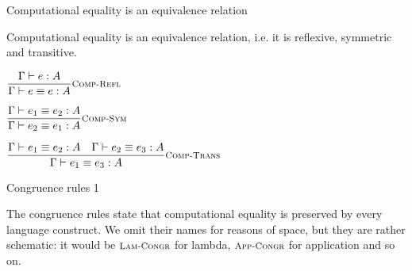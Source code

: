 \documentclass{beamer}
\begin{document}
\begin{frame}{Computational equality is an equivalence relation}

Computational equality is an equivalence relation, i.e. it is reflexive, symmetric and transitive.

\vspace{2em}

\begin{center}
  $\infrule[Comp-Refl]{\typing{e}{A}}{\compeq{e}{e}{A}}$

  \vspace{2em}

  $\infrule[Comp-Sym]{\compeq{e_1}{e_2}{A}}{\compeq{e_2}{e_1}{A}}$

  \vspace{2em}

  $\infrule[Comp-Trans]{\compeq{e_1}{e_2}{A} \quad \compeq{e_2}{e_3}{A}}{\compeq{e_1}{e_3}{A}}$
\end{center}

\end{frame}

\begin{frame}{Congruence rules 1}

The congruence rules state that computational equality is preserved by every language construct. We omit their names for reasons of space, but they are rather schematic: it would be $\textsc{\footnotesize{Lam-Congr}}$ for lambda, $\textsc{\footnotesize{App-Congr}}$ for application and so on.

\end{frame}
\end{document}
